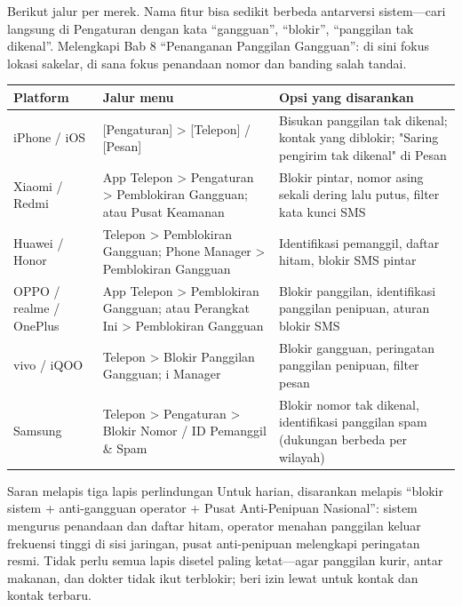 
Berikut jalur per merek. Nama fitur bisa sedikit berbeda antarversi sistem—cari langsung di Pengaturan dengan kata “gangguan”, “blokir”, “panggilan tak dikenal”. Melengkapi Bab 8 “Penanganan Panggilan Gangguan”: di sini fokus lokasi sakelar, di sana fokus penandaan nomor dan banding salah tandai.

\begin{center}
\begin{tabularx}{\linewidth}{|X|X|X|}
\hline
\textbf{Platform} & \textbf{Jalur menu} & \textbf{Opsi yang disarankan} \tabularnewline
\hline
iPhone / iOS & {}[Pengaturan] > [Telepon] / [Pesan] & Bisukan panggilan tak dikenal; kontak yang diblokir; "Saring pengirim tak dikenal" di Pesan \tabularnewline
Xiaomi / Redmi & App Telepon > Pengaturan > Pemblokiran Gangguan; atau Pusat Keamanan & Blokir pintar, nomor asing sekali dering lalu putus, filter kata kunci SMS \tabularnewline
Huawei / Honor & Telepon > Pemblokiran Gangguan; Phone Manager > Pemblokiran Gangguan & Identifikasi pemanggil, daftar hitam, blokir SMS pintar \tabularnewline
OPPO / realme / OnePlus & App Telepon > Pemblokiran Gangguan; atau Perangkat Ini > Pemblokiran Gangguan & Blokir panggilan, identifikasi panggilan penipuan, aturan blokir SMS \tabularnewline
vivo / iQOO & Telepon > Blokir Panggilan Gangguan; i Manager & Blokir gangguan, peringatan panggilan penipuan, filter pesan \tabularnewline
Samsung & Telepon > Pengaturan > Blokir Nomor / ID Pemanggil \& Spam & Blokir nomor tak dikenal, identifikasi panggilan spam (dukungan berbeda per wilayah) \tabularnewline
\hline
\end{tabularx}
\end{center}

\begin{tcbinfo}{Saran melapis tiga lapis perlindungan}
Untuk harian, disarankan melapis “blokir sistem + anti-gangguan operator + Pusat Anti-Penipuan Nasional”: sistem mengurus penandaan dan daftar hitam, operator menahan panggilan keluar frekuensi tinggi di sisi jaringan, pusat anti-penipuan melengkapi peringatan resmi. Tidak perlu semua lapis disetel paling ketat—agar panggilan kurir, antar makanan, dan dokter tidak ikut terblokir; beri izin lewat untuk kontak dan kontak terbaru.

\end{tcbinfo}

